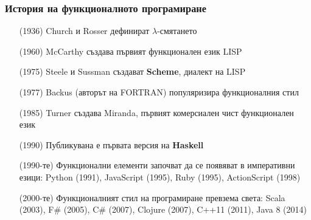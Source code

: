 \documentclass{beamer}
\begin{document}
\begin{frame}
  \frametitle{История на функционалното програмиране}

  \begin{itemize}[<+->]
  \item[(1936)] Church и Rosser дефинират $\lambda$-смятането
  \item[(1960)] McCarthy създава първият функционален език LISP
  \item[(1975)] Steele и Sussman създават \textbf{Scheme}, диалект на LISP
  \item[(1977)] Backus (авторът на FORTRAN) популяризира функционалния стил
  \item[(1985)] Turner създава Miranda, първият комерсиален чист функционален език
  \item[(1990)] Публикувана е първата версия на \textbf{Haskell}
  \item[(1990-те)] Функционални елементи започват да се появяват в императивни езици: Python (1991), JavaScript (1995), Ruby (1995), ActionScript (1998)
  \item[(2000-те)] Функционалният стил на програмиране превзема света: Scala (2003), F\# (2005), C\# (2007), Clojure (2007), C++11 (2011), Java 8 (2014)
  \end{itemize}
\end{frame}
\end{document}
